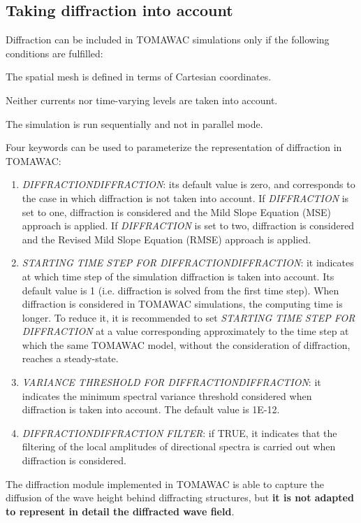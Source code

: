 \subsection{ Taking diffraction into account}

 Diffraction can be included in TOMAWAC simulations only if the following conditions are fulfilled:

 The spatial mesh is defined in terms of Cartesian coordinates.

 Neither currents nor time-varying levels are taken into account.

 The simulation is run sequentially and not in parallel mode.

 Four keywords can be used to parameterize the representation of diffraction in TOMAWAC:

\begin{enumerate}
\item  \textit{DIFFRACTIONDIFFRACTION}: its default value is zero, and corresponds to the case in which diffraction is not taken into account. If \textit{DIFFRACTION} is set to one, diffraction is considered and the Mild Slope Equation (MSE) approach is applied. If \textit{DIFFRACTION} is set to two, diffraction is considered and the Revised Mild Slope Equation (RMSE) approach is applied.

\item  \textit{STARTING TIME STEP FOR DIFFRACTIONDIFFRACTION}: it indicates at which time step of the simulation diffraction is taken into account. Its default value is 1 (i.e. diffraction is solved from the first time step). When diffraction is considered in TOMAWAC simulations, the computing time is longer. To reduce it, it is recommended to set \textit{STARTING TIME STEP FOR DIFFRACTION} at a value corresponding approximately to the time step at which the same TOMAWAC model, without the consideration of diffraction, reaches a steady-state.

\item  \textit{VARIANCE THRESHOLD FOR DIFFRACTIONDIFFRACTION}: it indicates the minimum spectral variance threshold considered when diffraction is taken into account. The default value is 1E-12.

\item  \textit{DIFFRACTIONDIFFRACTION FILTER}: if TRUE, it indicates that the filtering of the local amplitudes of directional spectra is carried out when diffraction is considered.
\end{enumerate}

 The diffraction module implemented in TOMAWAC is able to capture the diffusion of the wave height behind diffracting structures, but \textbf{it is not adapted to represent in detail the diffracted wave field}.

